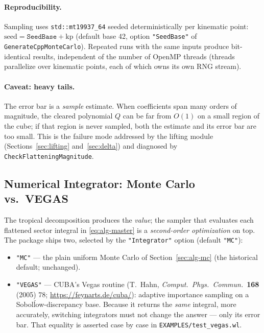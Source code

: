 \documentclass[11pt,a4paper]{article}
\begin{document}
\paragraph{Reproducibility.} Sampling uses \texttt{std::mt19937\_64} seeded
deterministically per kinematic point: $\mathrm{seed} = \texttt{SeedBase} +
\mathrm{kp}$ (default base 42, option \texttt{"SeedBase"} of
\texttt{GenerateCppMonteCarlo}). Repeated runs with the same inputs produce
bit-identical results, independent of the number of OpenMP threads (threads
parallelize over kinematic points, each of which owns its own RNG stream).

\paragraph{Caveat: heavy tails.} The error bar is a \emph{sample} estimate.
When coefficients span many orders of magnitude, the cleared polynomial $Q$
can be far from $O(1)$ on a small region of the cube; if that region is never
sampled, both the estimate and its error bar are too small. This is the
failure mode addressed by the lifting module
(Sections~\ref{sec:lifting} and~\ref{sec:delta}) and diagnosed by
\texttt{CheckFlatteningMagnitude}.

\subsection{Numerical Integrator: Monte Carlo vs.\ VEGAS}\label{sec:vegas}

The tropical decomposition produces the \emph{value}; the sampler that
evaluates each flattened sector integral in \eqref{eq:alg-master} is a
\emph{second-order optimization} on top. The package ships two, selected by the
\texttt{"Integrator"} option (default \texttt{"MC"}):
\begin{itemize}
\item \texttt{"MC"} --- the plain uniform Monte Carlo of
  Section~\ref{sec:alg-mc} (the historical default; unchanged).
\item \texttt{"VEGAS"} --- CUBA's Vegas routine (T.~Hahn, \emph{Comput.\ Phys.\
  Commun.}\ \textbf{168} (2005) 78; \url{https://feynarts.de/cuba/}): adaptive
  importance sampling on a Sobol\' low-discrepancy base. Because it returns the
  \emph{same} integral, more accurately, switching integrators must not change
  the answer --- only its error bar. That equality is asserted case by case in
  \texttt{EXAMPLES/test\_vegas.wl}.
\end{itemize}
\end{document}
